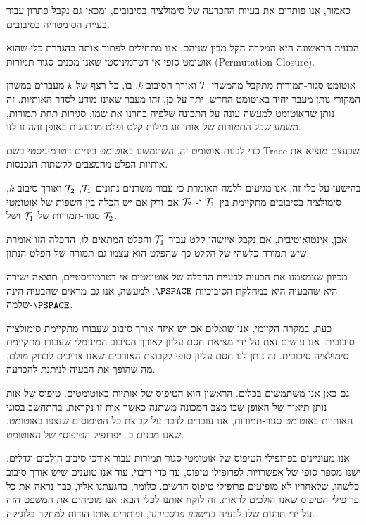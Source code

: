 {כאמור, אנו פותרים את בעיות ההכרעה של סימולציה בסיבובים, ומכאן גם נקבל פתרון עבור בעיית הסימטריה בסיבובים.

הבעיה הראשונה היא המקרה הקל מבין שניהם. אנו מתחילים לפתור אותה בהגדרת כלי שהוא אוטומט סופי אי-דטרמיניסטי שאנו מכנים סגור-תמורות 
(\textenglish{Permutation Closure}).

אוטומט סגור-תמורות מתקבל מהמשרן
$\cT$
ואורך הסיבוב 
$k$. 
בו, כל רצף של
$k$
מעברים במשרן המקורי נותן מעבר יחיד באוטומט החדש. יתר על כן, זהו מעבר שאינו מודע לסדר האותיות. זה נותן שהאוטומט למעשה עונה על התכונה שלפיה בחרנו את שמו: סגירות תחת תמורות, משמע שכל התמורות של אותו זוג מילות קלט ופלט מתנהגות באופן זהה זו לזו.

כדי לבנות אוטומט זה, השתמשנו באוטומט ביניים דטרמיניסטי בשם
\textenglish{Trace}
שבעצם מוציא את אותיות הפלט מהמצבים לקשתות הנכנסות.

בהישען על כלי זה, אנו מגיעים ללמה האומרת כי עבור משרנים נתונים
$\cT_1$, $\cT_2$
ואורך סיבוב
$k$,
סימולציה בסיבובים מתקיימת בין
$\cT_1$
ו-
$\cT_2$
אם ורק אם יש הכלה בין השפות של אוטומטי סגור-תמורות של
$\cT_1$
ושל
$\cT_2$.

אכן, אינטואיטיבית, אם נקבל איזשהו קלט עבור
$\cT_1$
והפלט המתאים לו, ההכלה הזו אומרת שיש תמורה כלשהי של הקלט כך שהפלט הוא עצמו גם תמורה של הפלט הנתון.

מכיוון שצמצמנו את הבעיה לבעיית ההכלה של אוטומטים אי-דטרמיניסטיים, תוצאה ישירה היא שהבעיה היא במחלקת הסיבוכיות
$\PSPACE$.
 למעשה, אנו גם מראים שהבעיה הינה
$\PSPACE$-שלמה.

כעת, במקרה הקיומי, אנו שואלים אם יש איזה אורך סיבוב שעבורו מתקיימת סימולציה סיבובית. אנו עושים זאת על ידי מציאת חסם עליון לאורך הסיבוב המינימלי שעבורו מתקיימת סימולציה סיבובית. זה נותן לנו חסם עליון סופי לקבוצת האורכים שאנו צריכים לבדוק מולם, מה שהופך את הבעיה לניתנת להכרעה.

גם כאן אנו משתמשים בכלים. הראשון הוא הטיפוס של אותיות באוטומטים. טיפוס של אות נותן תיאור של האופן שבו מצב המכונה משתנה כאשר אות זו נקראת. בהתחשב בסוגי האותיות באוטומט סגור-תמורות, אנו עוברים לדבר על קבוצת כל הטיפוסים שנצפו באוטומט, שאנו מכנים ב- ״פרופיל הטיפוס״ של האוטומט.

אנו מעוניינים בפרופילי הטיפוס של אוטומטי סגור-תמורות עבור אורכי סיבוב הולכים וגדלים. ישנו מספר סופי של אפשרויות לפרופילי טיפוס, עד כדי ריבוי. עוד אנו טוענים שיש אורך סיבוב כלשהו, שלאחריו לא מופיעים פרופילי טיפוס חדשים. כלומר, בהגעתנו אליו, כבר נראה את כל פרופילי הטיפוס שאנו הולכים לראות. זה לוקח אותנו לכלי הבא: אנו מוכיחים את המשפט הזה על ידי תרגום שלו לבעיה 
\emph{בחשבון פרסבורגר}, 
ופותרים אותו הודות למחקר בלוגיקה.

}
